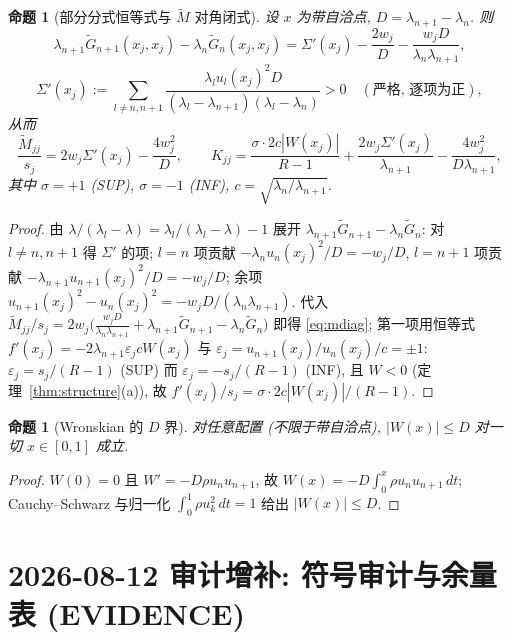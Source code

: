 \documentclass[UTF8]{ctexart}
\newtheorem{proposition}[theorem]{命题}
\begin{document}
\begin{proposition}[部分分式恒等式与 $\tilde M$ 对角闭式]\label{prop:pf}
设 $x$ 为带自洽点, $D=\lambda_{n+1}-\lambda_n$. 则
\begin{equation}\label{eq:pf}
	\lambda_{n+1}\tilde G_{n+1}(x_j,x_j)-\lambda_n\tilde G_n(x_j,x_j)
	=\Sigma'(x_j)-\frac{2w_j}{D}-\frac{w_jD}{\lambda_n\lambda_{n+1}},
\end{equation}
\begin{equation*}
	\Sigma'(x_j):=\sum_{l\ne n,n+1}
	\frac{\lambda_l u_l(x_j)^2D}{(\lambda_l-\lambda_{n+1})(\lambda_l-\lambda_n)}>0
	\quad(\text{严格, 逐项为正}),
\end{equation*}
从而
\begin{equation}\label{eq:mdiag}
	\frac{\tilde M_{jj}}{s_j}=2w_j\Sigma'(x_j)-\frac{4w_j^2}{D},
	\qquad
	K_{jj}=\frac{\sigma\cdot 2c|W(x_j)|}{R-1}
	+\frac{2w_j\Sigma'(x_j)}{\lambda_{n+1}}
	-\frac{4w_j^2}{D\lambda_{n+1}},
\end{equation}
其中 $\sigma=+1$ (SUP), $\sigma=-1$ (INF), $c=\sqrt{\lambda_n/\lambda_{n+1}}$.
\end{proposition}
\begin{proof}
由 $\lambda/(\lambda_l-\lambda)=\lambda_l/(\lambda_l-\lambda)-1$ 展开
$\lambda_{n+1}\tilde G_{n+1}-\lambda_n\tilde G_n$: 对 $l\ne n,n+1$ 得
$\Sigma'$ 的项; $l=n$ 项贡献 $-\lambda_nu_n(x_j)^2/D=-w_j/D$,
$l=n+1$ 项贡献 $-\lambda_{n+1}u_{n+1}(x_j)^2/D=-w_j/D$; 余项
$u_{n+1}(x_j)^2-u_n(x_j)^2=-w_jD/(\lambda_n\lambda_{n+1})$. 代入
$\tilde M_{jj}/s_j=2w_j\bigl(\frac{w_jD}{\lambda_n\lambda_{n+1}}
+\lambda_{n+1}\tilde G_{n+1}-\lambda_n\tilde G_n\bigr)$
即得 \eqref{eq:mdiag}; 第一项用恒等式
$f'(x_j)=-2\lambda_{n+1}\varepsilon_jcW(x_j)$ 与
$\varepsilon_j=u_{n+1}(x_j)/u_n(x_j)/c=\pm1$:
$\varepsilon_j=s_j/(R-1)$ (SUP) 而 $\varepsilon_j=-s_j/(R-1)$ (INF),
且 $W<0$ (定理~\ref{thm:structure}(a)), 故
$f'(x_j)/s_j=\sigma\cdot 2c|W(x_j)|/(R-1)$.
\end{proof}

\begin{proposition}[Wronskian 的 $D$ 界]\label{prop:Wbound}
对任意配置 (不限于带自洽点), $|W(x)|\le D$ 对一切 $x\in[0,1]$ 成立.
\end{proposition}
\begin{proof}
$W(0)=0$ 且 $W'=-D\rho u_nu_{n+1}$, 故
$W(x)=-D\int_0^x\rho u_nu_{n+1}\,dt$; Cauchy--Schwarz 与归一化
$\int_0^1\rho u_k^2\,dt=1$ 给出 $|W(x)|\le D$.
\end{proof}

\section{2026-08-12 审计增补: 符号审计与余量表 (EVIDENCE)}\label{sec:aug-ev}
\end{document}
